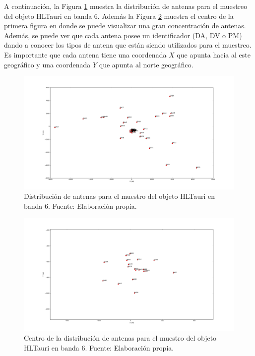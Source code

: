 A continuación, la Figura \ref{fig:almaarray1} muestra la distribución de antenas para el muestreo del objeto HLTauri en banda 6. Además la Figura \ref{fig:almaarray2} muestra el centro de la primera figura en donde se puede visualizar una gran concentración de antenas. Además, se puede ver que cada antena posee un identificador (DA, DV o PM) dando a conocer los tipos de antena que están siendo utilizados para el muestreo. Es importante que cada antena tiene una coordenada $X$ que apunta hacia al este geográfico y una coordenada $Y$ que apunta al norte geográfico.

\begin{figure}[h!]
\centering
\includegraphics[scale=0.25]{images/HLTau_B6antennas1.png}
\caption{Distribución de antenas para el muestro del objeto HLTauri en banda 6. Fuente: Elaboración propia.}
\label{fig:almaarray1}
\end{figure}

\begin{figure}[h!]
\centering
\includegraphics[scale=0.25]{images/HLTau_B6antennasCenter.png}
\caption{Centro de la distribución de antenas para el muestro del objeto HLTauri en banda 6. Fuente: Elaboración propia.}
\label{fig:almaarray2}
\end{figure}

